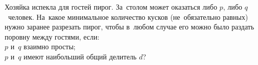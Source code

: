 \begin{problems}
\item
Хозяйка испекла для гостей пирог.
За~столом может оказаться либо $p$, либо $q$~человек.
На~какое минимальное количество кусков (не~обязательно равных) нужно заранее
разрезать пирог, чтобы в~любом случае его можно было раздать поровну между
гостями, если:
\\
\subproblem $p$ и~$q$ взаимно просты;
\\
\subproblem $p$ и~$q$ имеют наибольший общий делитель $d$?


\end{problems}

